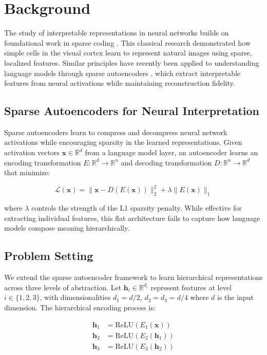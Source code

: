 \section{Background}

The study of interpretable representations in neural networks builds on foundational work in sparse coding \cite{Olshausen1996EmergenceOS}. This classical research demonstrated how simple cells in the visual cortex learn to represent natural images using sparse, localized features. Similar principles have recently been applied to understanding language models through sparse autoencoders \cite{anthropic2022decomposition}, which extract interpretable features from neural activations while maintaining reconstruction fidelity.

\subsection{Sparse Autoencoders for Neural Interpretation}
Sparse autoencoders learn to compress and decompress neural network activations while encouraging sparsity in the learned representations. Given activation vectors $\mathbf{x} \in \mathbb{R}^d$ from a language model layer, an autoencoder learns an encoding transformation $E: \mathbb{R}^d \rightarrow \mathbb{R}^n$ and decoding transformation $D: \mathbb{R}^n \rightarrow \mathbb{R}^d$ that minimize:

\begin{equation}
\mathcal{L}(\mathbf{x}) = \|\mathbf{x} - D(E(\mathbf{x}))\|_2^2 + \lambda\|E(\mathbf{x})\|_1
\end{equation}

where $\lambda$ controls the strength of the L1 sparsity penalty. While effective for extracting individual features, this flat architecture fails to capture how language models compose meaning hierarchically.

\subsection{Problem Setting}
We extend the sparse autoencoder framework to learn hierarchical representations across three levels of abstraction. Let $\mathbf{h}_i \in \mathbb{R}^{d_i}$ represent features at level $i \in \{1,2,3\}$, with dimensionalities $d_1 = d/2$, $d_2 = d_3 = d/4$ where $d$ is the input dimension. The hierarchical encoding process is:

\begin{align}
\mathbf{h}_1 &= \text{ReLU}(E_1(\mathbf{x})) \\
\mathbf{h}_2 &= \text{ReLU}(E_2(\mathbf{h}_1)) \\
\mathbf{h}_3 &= \text{ReLU}(E_3(\mathbf{h}_2))
\end{align}

